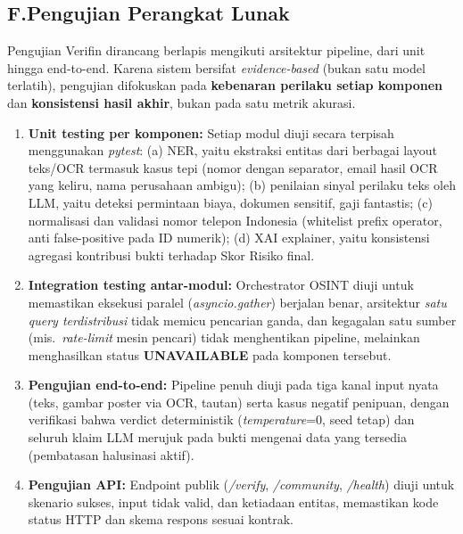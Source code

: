\documentclass[12pt,a4paper]{article}
\begin{document}
\subsection*{F.\quad Pengujian Perangkat Lunak}

Pengujian Verifin dirancang berlapis mengikuti arsitektur pipeline, dari unit hingga end-to-end.
Karena sistem bersifat \textit{evidence-based} (bukan satu model terlatih), pengujian difokuskan
pada \textbf{kebenaran perilaku setiap komponen} dan \textbf{konsistensi hasil akhir}, bukan pada
satu metrik akurasi.

\begin{enumerate}[label=\textbf{\arabic*.}]
\item \textbf{Unit testing per komponen:} Setiap modul diuji secara terpisah menggunakan
\textit{pytest}: (a) NER, yaitu ekstraksi entitas dari berbagai layout teks/OCR termasuk kasus
tepi (nomor dengan separator, email hasil OCR yang keliru, nama perusahaan ambigu); (b) penilaian
sinyal perilaku teks oleh LLM, yaitu deteksi permintaan biaya, dokumen sensitif, gaji fantastis; (c) normalisasi dan
validasi nomor telepon Indonesia (whitelist prefix operator, anti false-positive pada ID numerik);
(d) XAI explainer, yaitu konsistensi agregasi kontribusi bukti terhadap Skor Risiko final.

\item \textbf{Integration testing antar-modul:} Orchestrator OSINT diuji untuk memastikan eksekusi
paralel (\textit{asyncio.gather}) berjalan benar, arsitektur \emph{satu query terdistribusi} tidak
memicu pencarian ganda, dan kegagalan satu sumber (mis.\ \textit{rate-limit} mesin pencari) tidak
menghentikan pipeline, melainkan menghasilkan status \textbf{UNAVAILABLE} pada
komponen tersebut.

\item \textbf{Pengujian end-to-end:} Pipeline penuh diuji pada tiga kanal input nyata (teks, gambar
poster via OCR, tautan) serta kasus negatif penipuan, dengan verifikasi bahwa verdict deterministik
(\textit{temperature}=0, seed tetap) dan seluruh klaim LLM merujuk pada bukti mengenai data yang tersedia
(pembatasan halusinasi aktif).

\item \textbf{Pengujian API:} Endpoint publik (\textit{/verify}, \textit{/community}, \textit{/health})
diuji untuk skenario sukses, input tidak valid, dan ketiadaan entitas, memastikan kode status HTTP
dan skema respons sesuai kontrak.
\end{enumerate}
\end{document}
